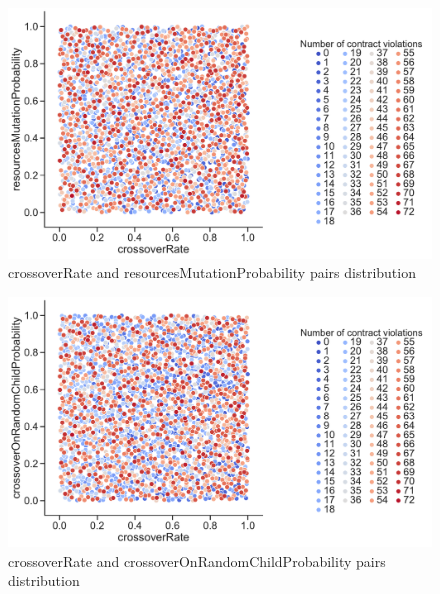 \begin{figure}
	\centering
	\includegraphics[width=\textwidth]{images/PairsDistr/crossoverRate_resourcesMutationProbability.pdf}
	\caption[crossoverRate and resourcesMutationProbability pairs distribution]{crossoverRate and resourcesMutationProbability pairs distribution}
	\label{fig:crossoverRate_resourcesMutationProbability_pair}
\end{figure}
\begin{figure}
	\centering
	\includegraphics[width=\textwidth]{images/PairsDistr/crossoverRate_crossoverOnRandomChildProbability.pdf}
	\caption[crossoverRate and crossoverOnRandomChildProbability pairs distribution]{crossoverRate and crossoverOnRandomChildProbability pairs distribution}
	\label{fig:crossoverRate_crossoverOnRandomChildProbability_pair}
\end{figure}
